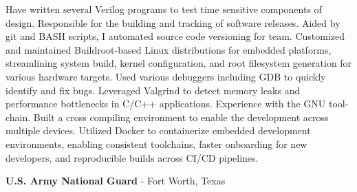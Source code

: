 \documentclass[letterpaper,MMMyyyy,nonstopmode]{simpleresumecv}
\begin{document}
\begin{Body}
\begin{Detail}
        \vspace{1mm} %
        \BulletItem
        Have written several Verilog programs to test time sensitive components of design.
        \vspace{1mm} %
        \BulletItem
        Responsible for the building and tracking of software releases. Aided by git and BASH scripts, I automated source code versioning for team.
        \vspace{1mm} %
        \BulletItem
        Customized and maintained Buildroot-based Linux distributions for embedded platforms, streamlining system build, kernel configuration, and root filesystem generation for various hardware targets.
        \vspace{1mm} %
        \BulletItem
        Used various debuggers including GDB to quickly identify and fix bugs. Leveraged Valgrind to detect memory leaks and performance bottlenecks in C/C++ applications.
        \vspace{1mm} %
        \BulletItem
        Experience with the GNU tool-chain. Built a cross compiling environment to enable the development across multiple devices.
        \vspace{1mm} %
        \BulletItem
        Utilized Docker to containerize embedded development environments, enabling consistent toolchains, faster onboarding for new developers, and reproducible builds across CI/CD pipelines.
        \vspace{1mm} %
    \end{Detail}

    \vspace{3mm} %

    {\textbf{U.S. Army National Guard}}
    - Fort Worth, Texas


\end{Body}
\end{document}
